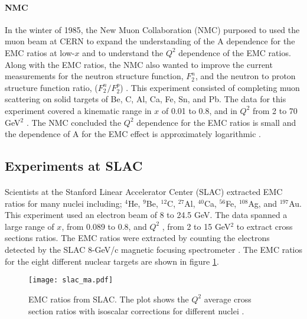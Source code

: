 \paragraph{NMC}In the winter of 1985, the New Muon Collaboration (NMC) purposed to used the muon beam at CERN to expand the understanding of the A dependence for the EMC ratios at low-$x$ and to understand the $Q^2$ dependence of the EMC ratios. Along with the EMC ratios, the NMC also wanted to improve the current measurements for the neutron structure function, $F_2^n$, and the neutron to proton structure function ratio, ($F_2^n/F_2^p$) \cite{NMCtech}. This experiment consisted of completing muon scattering on solid targets of Be, C, Al, Ca, Fe, Sn, and Pb. The data for this experiment covered a kinematic range in $x$ of 0.01 to 0.8, and in $Q^2$ from 2 to 70 GeV$^2$ \cite{ref:NMC}. The NMC concluded the $Q^2$ dependence for the EMC ratios is small and the dependence of A for the EMC effect is approximately logarithmic \cite{ref:NMC,Ajth}. 

\subsection{Experiments at SLAC}
\paragraph{}Scientists at the Stanford Linear Accelerator Center (SLAC) extracted EMC ratios for many nuclei including; $^4$He, $^9$Be, $^{12}$C, $^{27}$Al, $^{40}$Ca, $^{56}$Fe, $^{108}$Ag, and $^{197}$Au. This experiment used an electron beam of 8 to 24.5 GeV. The data spanned a large range of $x$, from 0.089 to 0.8, and $Q^2$ , from 2 to 15 GeV$^2$ to extract cross sections ratios. The EMC ratios were extracted by counting the electrons detected by the SLAC 8-GeV/c magnetic focusing spectrometer \cite{gomez}. The EMC ratios for the eight different nuclear targets are shown in figure \ref{gomez_ma}.
\begin{figure}[]
	\centering
		\texttt{[image: slac\_ma.pdf]} 
		\caption{EMC ratios from SLAC. The plot shows the $Q^2$ average cross section ratios with isoscalar corrections for different nuclei \cite{gomez}.}
		\label{gomez_ma}
\end{figure} 
